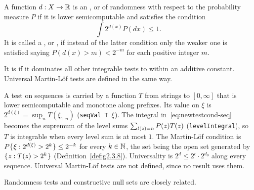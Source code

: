  \begin{definition}
  \label{def:g2.3.29}
  \leanok
A function \( d:X\to\mathbb{R} \) is an , or 
of randomness with respect to the probability measure \( P \)
if it is lower semicomputable and satisfies the condition
 \begin{equation} 	\label{eq:newtestcond-seq}
   \int 2^{d(x)}P(dx) \le 1.
 \end{equation}
It is called a , or ,
if instead of the latter condition
only the weaker one is satisfied saying \( P(d(x)>m)<2^{-m} \) for each
positive integer \( m \).

It is  if it dominates all other integrable tests to within an
additive constant.
Universal Martin-L\"of tests are defined in the same way.
 \end{definition}

\begin{formalization}
A test on sequences is carried by a function \( T \) from strings to \( [0,\infty] \) that is
lower semicomputable and monotone along prefixes. Its value on \( \xi \) is
\( 2^{d(\xi)} = \sup_{n} T(\xi_{1:n}) \) (\texttt{seqVal T \( \xi \)}). The integral
in~\eqref{eq:newtestcond-seq} becomes the supremum of the level sums
\( \sum_{l(z) = n} P(z) T(z) \) (\texttt{levelIntegral}), so \( T \) is integrable when
every level sum is at most \( 1 \). The Martin-L\"of condition is
\( P\mathopen\{\mskip 1mu\xi : 2^{d(\xi)} > 2^{k}\mskip 1mu\mathclose\} \le 2^{-k} \) for every \( k \in \mathbb{N} \), the set being the
open set generated by \( \mathopen\{\mskip 1mu z : T(z) > 2^{k}\mskip 1mu\mathclose\} \) (Definition~\ref{def:g2.3.8}).
Universality is \( 2^{d} \le 2^{c} \cdot 2^{d_{0}} \) along every sequence. Universal
Martin-L\"of tests are not defined, since no result uses them.
\end{formalization}

Randomness tests and constructive null sets are closely related.

